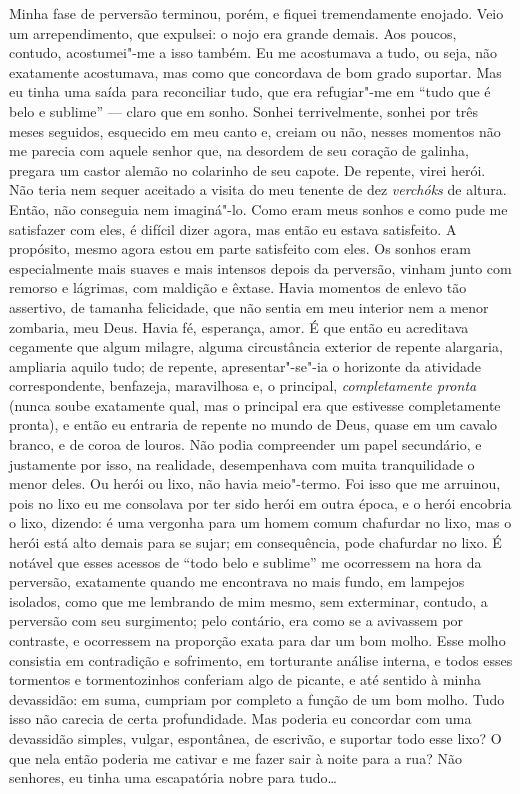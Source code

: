 Minha fase de perversão terminou, porém, e fiquei tremendamente enojado.
Veio um arrependimento, que expulsei: o nojo era grande demais. Aos
poucos, contudo, acostumei"-me a isso também. Eu me acostumava a tudo, ou
seja, não exatamente acostumava, mas como que concordava de bom grado
suportar. Mas eu tinha uma saída para reconciliar tudo, que era
refugiar"-me em ``tudo que é belo e sublime'' --- claro que em sonho.
Sonhei terrivelmente, sonhei por três meses seguidos, esquecido em meu
canto e, creiam ou não, nesses momentos não me parecia com aquele senhor
que, na desordem de seu coração de galinha, pregara um castor alemão no
colarinho de seu capote. De repente, virei herói. Não teria nem sequer
aceitado a visita do meu tenente de dez \emph{verchóks} de altura.
Então, não conseguia nem imaginá"-lo. Como eram meus sonhos e como pude
me satisfazer com eles, é difícil dizer agora, mas então eu estava
satisfeito. A propósito, mesmo agora estou em parte satisfeito com eles.
Os sonhos eram especialmente mais suaves e mais intensos depois da
perversão, vinham junto com remorso e lágrimas, com maldição e êxtase.
Havia momentos de enlevo tão assertivo, de tamanha felicidade, que não
sentia em meu interior nem a menor zombaria, meu Deus. Havia fé,
esperança, amor. É que então eu acreditava cegamente que algum milagre,
alguma circustância exterior de repente alargaria, ampliaria aquilo
tudo; de repente, apresentar"-se"-ia o horizonte da atividade
correspondente, benfazeja, maravilhosa e, o principal,
\emph{completamente pronta} (nunca soube exatamente qual, mas o
principal era que estivesse completamente pronta), e então eu entraria
de repente no mundo de Deus, quase em um cavalo branco, e de coroa de
louros. Não podia compreender um papel secundário, e justamente por
isso, na realidade, desempenhava com muita tranquilidade o menor deles.
Ou herói ou lixo, não havia meio"-termo. Foi isso que me arruinou, pois
no lixo eu me consolava por ter sido herói em outra época, e o herói
encobria o lixo, dizendo: é uma vergonha para um homem comum chafurdar
no lixo, mas o herói está alto demais para se sujar; em consequência,
pode chafurdar no lixo. É notável que esses acessos de ``todo belo e
sublime'' me ocorressem na hora da perversão, exatamente quando me
encontrava no mais fundo, em lampejos isolados, como que me lembrando de
mim mesmo, sem exterminar, contudo, a perversão com seu surgimento; pelo
contário, era como se a avivassem por contraste, e ocorressem na
proporção exata para dar um bom molho. Esse molho consistia em
contradição e sofrimento, em torturante análise interna, e todos esses
tormentos e tormentozinhos conferiam algo de picante, e até sentido à
minha devassidão: em suma, cumpriam por completo a função de um bom
molho. Tudo isso não carecia de certa profundidade. Mas poderia eu
concordar com uma devassidão simples, vulgar, espontânea, de escrivão, e
suportar todo esse lixo? O que nela então poderia me cativar e me fazer
sair à noite para a rua? Não senhores, eu tinha uma escapatória nobre
para tudo\ldots{}


